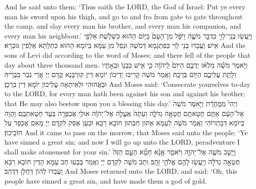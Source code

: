 {{And he said unto them: ‘Thus saith the LORD, the God of Israel: Put ye every man his sword upon his thigh, and go to and fro from gate to gate throughout the camp, and slay every man his brother, and every man his companion, and every man his neighbour.’}{}
{וַיַּֽעֲשׂ֥וּ בְנֵֽי־לֵוִ֖י כִּדְבַ֣ר מֹשֶׁ֑ה וַיִּפֹּ֤ל מִן־הָעָם֙ בַּיּ֣וֹם הַה֔וּא כִּשְׁלֹ֥שֶׁת אַלְפֵ֖י אִֽישׁ׃}
{וַעֲבַדוּ בְנֵי לֵוִי כְּפִתְגָמָא דְּמֹשֶׁה וּנְפַל מִן עַמָּא בְּיוֹמָא הַהוּא כִּתְלָתָא אַלְפִין גּוּבְרָא׃}
{And the sons of Levi did according to the word of Moses; and there fell of the people that day about three thousand men.}{}
{וַיֹּ֣אמֶר מֹשֶׁ֗ה מִלְא֨וּ יֶדְכֶ֤ם הַיּוֹם֙ לַֽיהֹוָ֔ה כִּ֛י אִ֥ישׁ בִּבְנ֖וֹ וּבְאָחִ֑יו וְלָתֵ֧ת עֲלֵיכֶ֛ם הַיּ֖וֹם בְּרָכָֽה׃
}
{וַאֲמַר מֹשֶׁה קָרִיבוּ יְדֵיכוֹן יוֹמָא דֵין קוּרְבָּנָא קֳדָם יְיָ אֲרֵי גְּבַר בִּבְרֵיהּ וּבַאֲחוּהִי וּלְאֵיתָאָה עֲלֵיכוֹן יוֹמָא דֵין בִּרְכָן׃}
{And Moses said: ‘Consecrate yourselves to-day to the LORD, for every man hath been against his son and against his brother; that He may also bestow upon you a blessing this day.’}{}
{וַיְהִי֙ מִֽמׇּחֳרָ֔ת וַיֹּ֤אמֶר מֹשֶׁה֙ אֶל־הָעָ֔ם אַתֶּ֥ם חֲטָאתֶ֖ם חֲטָאָ֣ה גְדֹלָ֑ה וְעַתָּה֙ אֶֽעֱלֶ֣ה אֶל־יְהֹוָ֔ה אוּלַ֥י אֲכַפְּרָ֖ה בְּעַ֥ד חַטַּאתְכֶֽם׃
}
{וַהֲוָה בְּיוֹמָא דְּבָתְרוֹהִי וַאֲמַר מֹשֶׁה לְעַמָּא אַתּוּן חַבְתּוּן חוֹבָא רַבָּא וּכְעַן אֶסַּק לִקְדָם יְיָ מָאִם אֲכַפַּר עַל חוֹבֵיכוֹן׃}
{And it came to pass on the morrow, that Moses said unto the people: ‘Ye have sinned a great sin; and now I will go up unto the LORD, peradventure I shall make atonement for your sin.’}{}
{וַיָּ֧שׇׁב מֹשֶׁ֛ה אֶל־יְהֹוָ֖ה וַיֹּאמַ֑ר אָ֣נָּ֗א חָטָ֞א הָעָ֤ם הַזֶּה֙ חֲטָאָ֣ה גְדֹלָ֔ה וַיַּֽעֲשׂ֥וּ לָהֶ֖ם אֱלֹהֵ֥י זָהָֽב׃
}
{וְתָב מֹשֶׁה לִקְדָם יְיָ וַאֲמַר בְּבָעוּ חָב עַמָּא הָדֵין חוֹבָא רַבָּא וַעֲבַדוּ לְהוֹן דַּחְלָן דִּדְהַב׃}
{And Moses returned unto the LORD, and said: ‘Oh, this people have sinned a great sin, and have made them a god of gold.}{}
}
